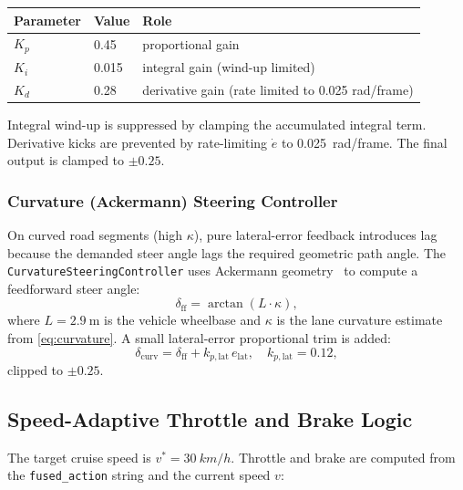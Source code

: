 \documentclass[12pt,a4paper]{article}
\begin{document}
\begin{center}
\begin{tabular}{@{}lll@{}}
\toprule
\textbf{Parameter} & \textbf{Value} & \textbf{Role} \\
\midrule
$K_p$ & 0.45 & proportional gain \\
$K_i$ & 0.015 & integral gain (wind-up limited) \\
$K_d$ & 0.28 & derivative gain (rate limited to 0.025 rad/frame) \\
\bottomrule
\end{tabular}
\end{center}

Integral wind-up is suppressed by clamping the accumulated integral term.
Derivative kicks are prevented by rate-limiting $\dot{e}$ to
\SI{0.025}{rad/frame}.  The final output is clamped to $\pm0.25$.

\subsubsection{Curvature (Ackermann) Steering Controller}

On curved road segments (high $\kappa$), pure lateral-error feedback
introduces lag because the demanded steer angle lags the required geometric
path angle.  The \texttt{CurvatureSteeringController} uses Ackermann
geometry~\cite{siegwart2011mobile} to compute a feedforward steer angle:
\begin{equation}
  \delta_\text{ff} = \arctan(L \cdot \kappa),
  \label{eq:ackermann}
\end{equation}
where $L = \SI{2.9}{\metre}$ is the vehicle wheelbase and $\kappa$ is the
lane curvature estimate from \cref{eq:curvature}.  A small lateral-error
proportional trim is added:
\begin{equation}
  \delta_\text{curv} = \delta_\text{ff}
                     + k_{p,\text{lat}}\,e_\text{lat},
  \quad k_{p,\text{lat}} = 0.12,
  \label{eq:curvature_ctrl}
\end{equation}
clipped to $\pm0.25$.

\subsection{Speed-Adaptive Throttle and Brake Logic}
\label{subsec:throttle_brake}

The target cruise speed is $v^* = \SI{30}{km/h}$.  Throttle and brake are
computed from the \texttt{fused\_action} string and the current speed $v$:
\end{document}
